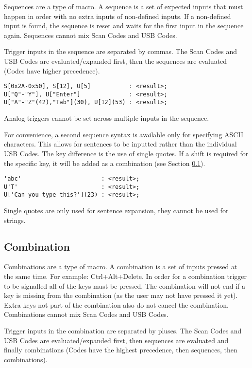 \documentclass{kiibohd-template}
\begin{document}
Sequences are a type of macro.
A sequence is a set of expected inputs that must happen in order with no extra inputs of non-defined inputs.
If a non-defined input is found, the sequence is reset and waits for the first input in the sequence again.
Sequences cannot mix Scan Codes and USB Codes.

Trigger inputs in the sequence are separated by commas.
The Scan Codes and USB Codes are evaluated/expanded first, then the sequences are evaluated (Codes have higher precedence).

\begin{lstlisting}
S[0x2A-0x50], S[12], U[5]           : <result>;
U["Q"-"Y"], U["Enter"]              : <result>;
U["A"-"Z"(42),"Tab"](30), U[12](53) : <result>;
\end{lstlisting}

Analog triggers cannot be set across multiple inputs in the sequence.

For convenience, a second sequence syntax is available only for specifying ASCII characters.
This allows for sentences to be inputted rather than the individual USB Codes.
The key difference is the use of single quotes.
If a shift is required for the specific key, it will be added as a combination (see Section \ref{subsec:Combination}).

\begin{lstlisting}
'abc'                       : <result>;
U'T'                        : <result>;
U['Can you type this?'](23) : <result>;
\end{lstlisting}

Single quotes are only used for sentence expansion, they cannot be used for strings.


\subsection{Combination}
\label{subsec:Combination}

Combinations are a type of macro.
A combination is a set of inputs pressed at the same time.
For example: Ctrl+Alt+Delete.
In order for a combination trigger to be signalled all of the keys must be pressed.
The combination will not end if a key is missing from the combination (as the user may not have pressed it yet).
Extra keys not part of the combination also do not cancel the combination.
Combinations cannot mix Scan Codes and USB Codes.

Trigger inputs in the combination are separated by pluses.
The Scan Codes and USB Codes are evaluated/expanded first, then sequences are evaluated and finally combinations (Codes have the highest precedence, then sequences, then combinations).
\end{document}
